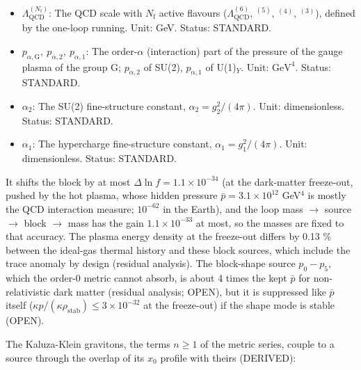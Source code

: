 \documentclass[
  10pt,
]{article}
\begin{document}
\begin{itemize}
  \(\rho - 3p\) of the energy-momentum tensor (interaction measure) of a
  plasma component: \(\Theta_{\mathrm{QCD}}\) of the quark-gluon plasma
  or hadron gas, \(\Theta_{\mathrm{G}}\) of the gauge plasma of the
  group G, \(\Theta_V\) of the thermal gas of the massive vector \(V\)
  (\(\Theta_{\mathrm{W}}\) of \(W^\pm\), \(\Theta_{\mathrm{Z}}\) of
  \(Z\)). Unit: \(\mathrm{GeV}^{4}\). Status: STANDARD.
\item
  \(\Lambda_{\mathrm{QCD}}^{(N_{\mathrm{f}})}\): The QCD scale with
  \(N_{\mathrm{f}}\) active flavours (\(\Lambda_{\mathrm{QCD}}^{(6)}\),
  \(^{(5)}\), \(^{(4)}\), \(^{(3)}\)), defined by the one-loop running.
  Unit: GeV. Status: STANDARD.
\item
  \(p_{\alpha,\mathrm{G}},\ p_{\alpha,2},\ p_{\alpha,1}\): The
  order-\(\alpha\) (interaction) part of the pressure of the gauge
  plasma of the group G; \(p_{\alpha,2}\) of SU(2), \(p_{\alpha,1}\) of
  U(1)\(_Y\). Unit: \(\mathrm{GeV}^{4}\). Status: STANDARD.
\item
  \(\alpha_2\): The SU(2) fine-structure constant,
  \(\alpha_2 = g_2^2/(4\pi)\). Unit: dimensionless. Status: STANDARD.
\item
  \(\alpha_1\): The hypercharge fine-structure constant,
  \(\alpha_1 = g_1^2/(4\pi)\). Unit: dimensionless. Status: STANDARD.
\end{itemize}

It shifts the block by at most \(\Delta\ln f = 1.1\times10^{-34}\) (at
the dark-matter freeze-out, pushed by the hot plasma, whose hidden
pressure \(\bar p = 3.1\times10^{12}\) GeV\(^4\) is mostly the QCD
interaction measure; \(10^{-62}\) in the Earth), and the loop mass
\(\to\) source \(\to\) block \(\to\) mass has the gain
\(1.1\times10^{-33}\) at most, so the masses are fixed to that accuracy.
The plasma energy density at the freeze-out differs by 0.13 \% between
the ideal-gas thermal history and these block sources, which include the
trace anomaly by design (residual analysis). The block-shape source
\(p_0 - p_5\), which the order-0 metric cannot absorb, is about 4 times
the kept \(\bar p\) for non-relativistic dark matter (residual analysis;
OPEN), but it is suppressed like \(\bar p\) itself
(\(\kappa p/(\kappa\rho_{\mathrm{stab}}) \le 3\times10^{-32}\) at the
freeze-out) if the shape mode is stable (OPEN).

The Kaluza-Klein gravitons, the terms \(n \ge 1\) of the metric series,
couple to a source through the overlap of its \(x_0\) profile with
theirs (DERIVED):
\end{document}

